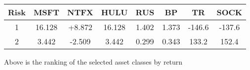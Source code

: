 \documentclass{article}
\begin{document}
\vspace{1cm}


\begin{center}

\begin{tabular}{cccccccc} \toprule
    Risk & MSFT & NTFX & HULU  & RUS & BP & TR & SOCK\\ \midrule
    1  & 16.128 & +8.872 & 16.128 & 1.402 & 1.373 & -146.6 & -137.6 \\
    2  & 3.442  & -2.509 & 3.442  & 0.299 & 0.343 & 133.2  & 152.4  \\

\end{tabular}

\end{center}


Above is the ranking of the selected asset classes by return


\medskip


\end{document}
